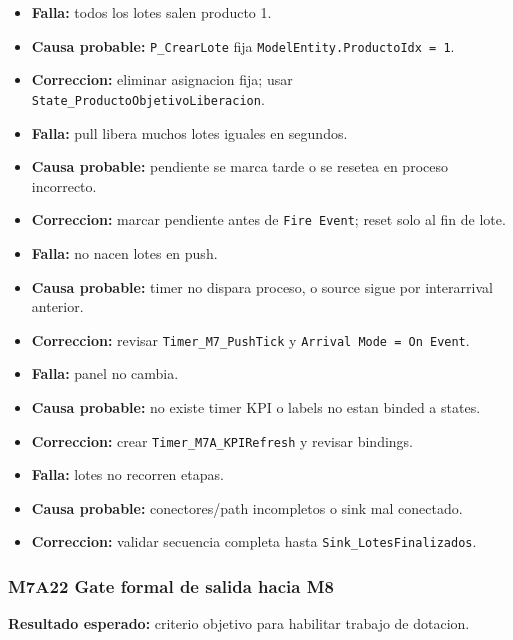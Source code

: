 \documentclass[11pt]{article}
\newcommand{\simio}[1]{\texttt{#1}}
\newcommand{\state}[1]{\texttt{#1}}
\newcommand{\proc}[1]{\texttt{#1}}
\begin{document}
\begin{itemize}
  \item \textbf{Falla:} todos los lotes salen producto 1.
  \item \textbf{Causa probable:} \proc{P\_CrearLote} fija \state{ModelEntity.ProductoIdx = 1}.
  \item \textbf{Correccion:} eliminar asignacion fija; usar \state{State\_ProductoObjetivoLiberacion}.
\end{itemize}

\begin{itemize}
  \item \textbf{Falla:} pull libera muchos lotes iguales en segundos.
  \item \textbf{Causa probable:} pendiente se marca tarde o se resetea en proceso incorrecto.
  \item \textbf{Correccion:} marcar pendiente antes de \simio{Fire Event}; reset solo al fin de lote.
\end{itemize}

\begin{itemize}
  \item \textbf{Falla:} no nacen lotes en push.
  \item \textbf{Causa probable:} timer no dispara proceso, o source sigue por interarrival anterior.
  \item \textbf{Correccion:} revisar \simio{Timer\_M7\_PushTick} y \simio{Arrival Mode = On Event}.
\end{itemize}

\begin{itemize}
  \item \textbf{Falla:} panel no cambia.
  \item \textbf{Causa probable:} no existe timer KPI o labels no estan binded a states.
  \item \textbf{Correccion:} crear \simio{Timer\_M7A\_KPIRefresh} y revisar bindings.
\end{itemize}

\begin{itemize}
  \item \textbf{Falla:} lotes no recorren etapas.
  \item \textbf{Causa probable:} conectores/path incompletos o sink mal conectado.
  \item \textbf{Correccion:} validar secuencia completa hasta \simio{Sink\_LotesFinalizados}.
\end{itemize}

\subsubsection{M7A22 Gate formal de salida hacia M8}
\textbf{Resultado esperado:} criterio objetivo para habilitar trabajo de dotacion.
\end{document}
